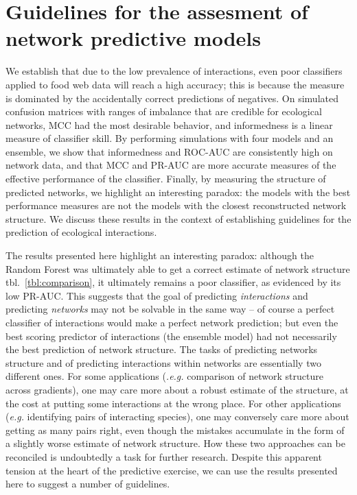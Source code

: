 \documentclass[11pt]{article}
\begin{document}
\hypertarget{guidelines-for-the-assesment-of-network-predictive-models}{%
\section{Guidelines for the assesment of network predictive
models}\label{guidelines-for-the-assesment-of-network-predictive-models}}

We establish that due to the low prevalence of interactions, even poor
classifiers applied to food web data will reach a high accuracy; this is
because the measure is dominated by the accidentally correct predictions
of negatives. On simulated confusion matrices with ranges of imbalance
that are credible for ecological networks, MCC had the most desirable
behavior, and informedness is a linear measure of classifier skill. By
performing simulations with four models and an ensemble, we show that
informedness and ROC-AUC are consistently high on network data, and that
MCC and PR-AUC are more accurate measures of the effective performance
of the classifier. Finally, by measuring the structure of predicted
networks, we highlight an interesting paradox: the models with the best
performance measures are not the models with the closest reconstructed
network structure. We discuss these results in the context of
establishing guidelines for the prediction of ecological interactions.

The results presented here highlight an interesting paradox: although
the Random Forest was ultimately able to get a correct estimate of
network structure tbl.~\ref{tbl:comparison}, it ultimately remains a
poor classifier, as evidenced by its low PR-AUC. This suggests that the
goal of predicting \emph{interactions} and predicting \emph{networks}
may not be solvable in the same way -- of course a perfect classifier of
interactions would make a perfect network prediction; but even the best
scoring predictor of interactions (the ensemble model) had not
necessarily the best prediction of network structure. The tasks of
predicting networks structure and of predicting interactions within
networks are essentially two different ones. For some applications
(\emph{.e.g.} comparison of network structure across gradients), one may
care more about a robust estimate of the structure, at the cost at
putting some interactions at the wrong place. For other applications
(\emph{e.g.} identifying pairs of interacting species), one may
conversely care more about getting as many pairs right, even though the
mistakes accumulate in the form of a slightly worse estimate of network
structure. How these two approaches can be reconciled is undoubtedly a
task for further research. Despite this apparent tension at the heart of
the predictive exercise, we can use the results presented here to
suggest a number of guidelines.
\end{document}
